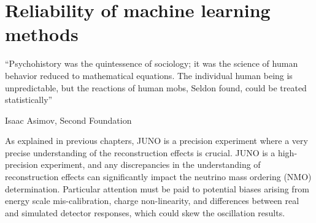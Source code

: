 \documentclass[../main.tex]{subfiles}
\begin{document}
\chapter{Reliability of machine learning methods}
\label{sec:janne}

\epigraph{``Psychohistory was the quintessence of sociology; it was the science of human behavior reduced to mathematical equations. The individual human being is unpredictable, but the reactions of human mobs, Seldon found, could be treated statistically''}{Isaac Asimov, Second Foundation}

\minitoc
%
%
%
%
%
As explained in previous chapters, JUNO is a precision experiment where a very precise understanding of the reconstruction effects is crucial. JUNO is a high-precision experiment, and any discrepancies in the understanding of reconstruction effects can significantly impact the neutrino mass ordering (NMO) determination. Particular attention must be paid to potential biases arising from energy scale mis-calibration, charge non-linearity, and differences between real and simulated detector responses, which could skew the oscillation results.
\end{document}
